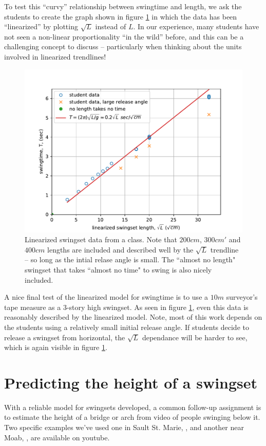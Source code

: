 \documentclass[12pt]{iopart}
\begin{document}
To test this ``curvy'' relationship between swingtime and length, we ask the students to create the graph shown in figure \ref{linearized_swingtime_graph} in which the data has been ``linearized'' by plotting $\sqrt{L}$ instead of $L$.  In our experience, many students have not seen a non-linear proportionality ``in the wild'' before, and this can be a challenging concept to discuss -- particularly when thinking about the units involved in linearized trendlines!   

\begin{figure}[h]
\centering
	\includegraphics[width=\columnwidth]{linearized_swingtime_graph.pdf}
\caption{
	Linearized swingset data from a class.  Note that $200cm$, $300cm'$ and $400cm$ lengths are included and described well by the $\sqrt{L}$ trendline -- so long as the intial relase angle is small.  The ``almost no length" swingset that takes ``almost no time" to swing is also nicely included.   
	}
	\label{linearized_swingtime_graph}
\end{figure}

A nice final test of the linearized model for swingtime is to use a $10m$ surveyor's tape measure as a 3-story high swingset.  As seen in figure \ref{linearized_swingtime_graph}, even this data is reasonably described by the linearized model.  Note, most of this work depends on the students using a relatively small initial release angle.  If students decide to release a swingset from horizontal, the $\sqrt{L}$ dependance will be harder to see, which is again visible in figure \ref{linearized_swingtime_graph}.


\section{Predicting the height of a swingset}
With a reliable model for swingsets developed, a common follow-up assignment is to estimate the height of a bridge or arch from video of people swinging below it.  Two specific examples we've used one in Sault St. Marie, \cite{swingset-sault-ste-marie}, and another near Moab, \cite{swingset-Moab}, are available on youtube.  
\end{document}
